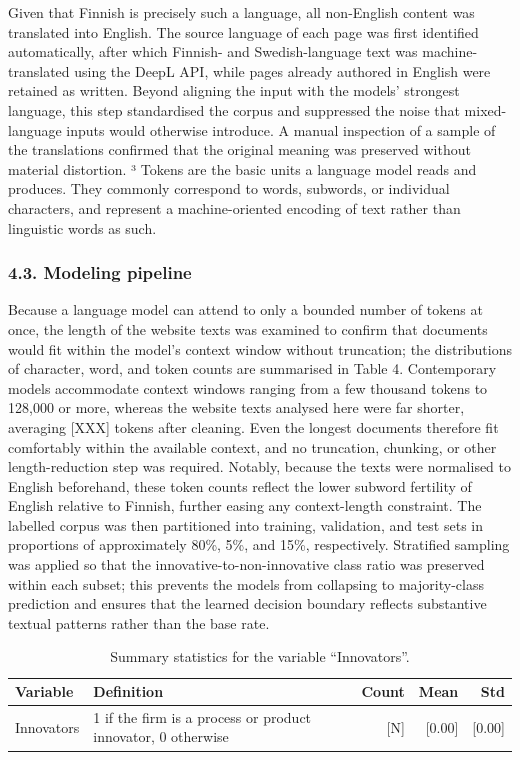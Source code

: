 \documentclass[runningheads]{llncs}
\begin{document}
Given that Finnish is precisely such a language, all non-English content was translated into English. The source language of each page was first identified automatically, after which Finnish- and Swedish-language text was machine-translated using the DeepL API, while pages already authored in English were retained as written. Beyond aligning the input with the models' strongest language, this step standardised the corpus and suppressed the noise that mixed-language inputs would otherwise introduce. A manual inspection of a sample of the translations confirmed that the original meaning was preserved without material distortion.
³ Tokens are the basic units a language model reads and produces. They commonly correspond to words, subwords, or individual characters, and represent a machine-oriented encoding of text rather than linguistic words as such.


\subsubsection{4.3. Modeling pipeline}

Because a language model can attend to only a bounded number of tokens at once, the length of the website texts was examined to confirm that documents would fit within the model's context window without truncation; the distributions of character, word, and token counts are summarised in Table 4. Contemporary models accommodate context windows ranging from a few thousand tokens to 128,000 or more, whereas the website texts analysed here were far shorter, averaging [XXX] tokens after cleaning. Even the longest documents therefore fit comfortably within the available context, and no truncation, chunking, or other length-reduction step was required. Notably, because the texts were normalised to English beforehand, these token counts reflect the lower subword fertility of English relative to Finnish, further easing any context-length constraint.
The labelled corpus was then partitioned into training, validation, and test sets in proportions of approximately 80\%, 5\%, and 15\%, respectively. Stratified sampling was applied so that the innovative-to-non-innovative class ratio was preserved within each subset; this prevents the models from collapsing to majority-class prediction and ensures that the learned decision boundary reflects substantive textual patterns rather than the base rate.

\begin{table}[h]
\centering
\caption{Summary statistics for the variable ``Innovators''.}
\label{tab:innovators}
\begin{tabular}{|l|p{6.2cm}|r|r|r|}
\hline
\textbf{Variable} & \textbf{Definition} & \textbf{Count} & \textbf{Mean} & \textbf{Std} \\
\hline
Innovators & 1 if the firm is a process or product innovator, 0 otherwise & [N] & [0.00] & [0.00] \\
\hline
\end{tabular}
\end{table}
\end{document}
